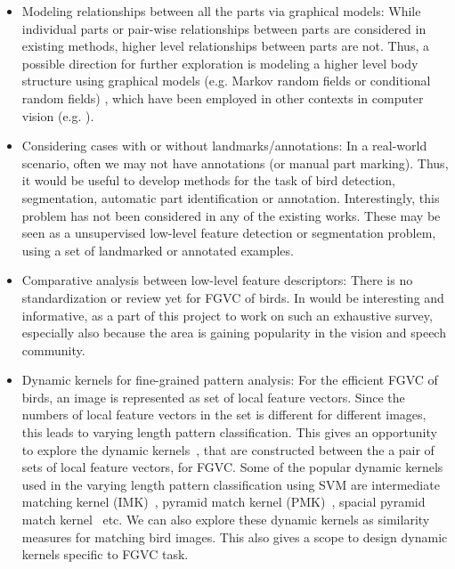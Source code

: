 \documentclass{article}
\begin{document}
\begin{itemize}
\item Modeling relationships between all the parts via graphical models: While
individual parts or pair-wise relationships between parts are considered in
existing methods, higher level relationships between parts are not.
Thus, a possible direction for further exploration is modeling a higher level
body structure using graphical models (e.g. Markov random fields or conditional
random fields) \cite{mrfbook,hmrf,mrf,crf,crf1}, which have been employed in 
other contexts in computer vision (e.g. \cite{mrfpose}). 

\item Considering cases with or without landmarks/annotations: In a real-world
scenario, often we may not have annotations (or manual part marking). Thus, it
would be useful to develop methods for the task of bird detection, segmentation,
automatic part identification or annotation. Interestingly, this problem has not
been considered in any of the existing works. These may be seen as a
unsupervised low-level feature detection or segmentation problem, using a set of
landmarked or annotated examples.

\item Comparative analysis between low-level feature descriptors: There is no
standardization or review yet for FGVC of birds. In would be interesting and
informative, as a part of this project to work on such an exhaustive survey,
especially also because the area is gaining popularity in the vision and speech
community.

\item Dynamic kernels for fine-grained pattern analysis: For the efficient FGVC
of birds, an image 
is represented as set of local feature vectors. Since the numbers of local
feature vectors in the set is different for different images, this leads to
varying length pattern classification. This gives an opportunity to explore the
dynamic kernels~\cite{DK_2003_MK_Wallraven}, that are constructed between the a
pair of sets of local feature vectors, for FGVC. Some of the popular dynamic
kernels used in the varying length pattern classification using SVM are
intermediate matching kernel (IMK)~\cite{IMK_2014_DAD_CC}, pyramid match kernel
(PMK)~\cite{PMK_2007_Grauman}, spacial pyramid match
kernel~\cite{SPMK_2006_Lazebnik} etc. We can also explore these dynamic kernels
as similarity measures for matching bird images. This also gives a scope to
design dynamic kernels specific to FGVC task. 
\end{itemize}
\end{document}
